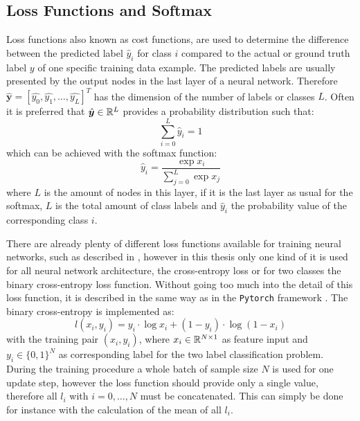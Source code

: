 
\subsection{Loss Functions and Softmax}
Loss functions also known as cost functions, are used to determine the difference between the predicted label $\hat{y}_i$ for class $i$ compared to the actual or ground truth label $y$ of one specific training data example.
The predicted labels are usually presented by the output nodes in the last layer of a neural network.
Therefore $\hat{\bm{y}} = [\hat{y_0}, \hat{y_1}, \dots, \hat{y_L}]^T$ has the dimension of the number of labels or classes $L$.
Often it is preferred that $\hat{\bm{y}} \in \mathbb{R}^L$ provides a probability distribution such that:
\begin{equation}
  \sum_{i=0}^L \hat{y}_i = 1
\end{equation}
which can be achieved with the softmax function:
\begin{equation}\label{eq:nn_theory_softmax}
  \hat{y}_i = \frac{\exp{x_i}}{\sum_{j=0}^{L}\exp{x_j}}
\end{equation}
where $L$ is the amount of nodes in this layer, if it is the last layer as usual for the softmax, $L$ is the total amount of class labels and $\hat{y}_i$ the probability value of the corresponding class $i$.

There are already plenty of different loss functions available for training neural networks, such as described in \cite{LeCun2006}, however in this thesis only one kind of it is used for all neural network architecture, the cross-entropy loss or for two classes the binary cross-entropy loss function.
Without going too much into the detail of this loss function, it is described in the same way as in the \texttt{Pytorch} framework \cite{Pytorch}.
The binary cross-entropy is implemented as:
\begin{equation}\label{eq:nn_theory_binary_cross_entropy}
  l(x_i, y_i) = y_i \cdot \log x_i + (1 - y_i) \cdot \log (1 - x_i)
\end{equation}
with the training pair $(x_i, y_i)$, where $x_i \in \mathbb{R}^{N \times 1}$ as feature input and $y_i \in \{0, 1\}^N$ as corresponding label for the two label classification problem.
During the training procedure a whole batch of sample size $N$ is used for one update step, however the loss function should provide only a single value, therefore all $l_i$ with $i = 0, \dots, N$ must be concatenated.
This can simply be done for instance with the calculation of the mean of all $l_i$.

